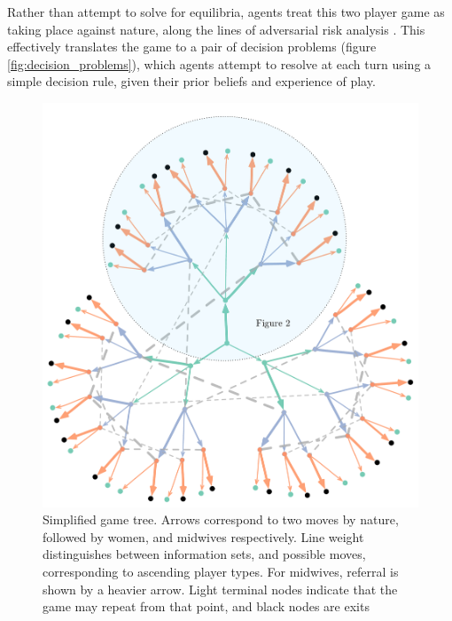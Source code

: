 Rather than attempt to solve for equilibria, agents treat this two player game as taking place against nature, along the lines of adversarial risk analysis \citep{RiosInsua2009}. This effectively translates the game to a pair of decision problems (figure \ref{fig:decision_problems}), which agents attempt to resolve at each turn using a simple decision rule, given their prior beliefs and experience of play.

\begin{figure}[H]
\begin{adjustbox}{center}
\includegraphics[width=119mm]{figures/rounded_clover_infosets}
\end{adjustbox}
\caption{Simplified game tree. Arrows correspond to two moves by nature, followed by women, and midwives respectively. Line weight distinguishes between information sets, and possible moves, corresponding to ascending player types. For midwives, referral is shown by a heavier arrow. Light terminal nodes indicate that the game may repeat from that point, and black nodes are exits}

\label{fig:simple_tree}
\end{figure}

